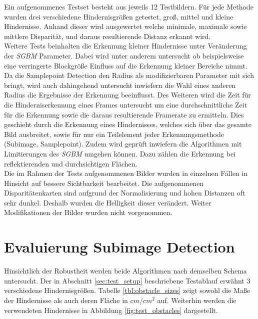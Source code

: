 \noindent
Ein aufgenommenes Testset besteht aus jeweils 12 Testbildern. Für jede Methode wurden drei verschiedene Hindernisgrößen getestet, groß, mittel und kleine Hindernisse. Anhand dieser wird ausgewertet welche minimale, maximale sowie mittlere Disparität, und daraus resultierende Distanz erkannt wird.\\

\noindent
Weitere Tests beinhalten die Erkennung kleiner Hindernisse unter Veränderung der \emph{SGBM} Parameter. Dabei wird unter anderem untersucht ob beispielsweise eine verringerte Blockgröße Einfluss auf die Erkennung kleiner Bereiche nimmt. Da die Samplepoint Detection den Radius als modifizierbaren Parameter mit sich bringt, wird auch dahingehend untersucht inwiefern die Wahl eines anderen Radius die Ergebnisse der Erkennung beeinflusst. Des Weiteren wird die Zeit für die Hinderniserkennung eines Frames untersucht um eine durchschnittliche Zeit für die Erkennung sowie die daraus resultierende Framerate zu ermitteln. Dies geschieht durch die Erkennung eines Hindernisses, welches sich über das gesamte Bild ausbreitet, sowie für nur ein Teilelement jeder Erkennungsmethode (Subimage, Samplepoint). Zudem wird geprüft inwiefern die Algorithmen mit Limitierungen des \emph{SGBM} umgehen können. Dazu zählen die Erkennung bei reflektierenden und durchsichtigen Flächen.\\

\noindent
Die im Rahmen der Tests aufgenommenen Bilder wurden in einzelnen Fällen in Hinsicht auf bessere Sichtbarkeit bearbeitet. Die aufgenommenen Disparitätenkarten sind aufgrund der Normalisierung und hohen Distanzen oft sehr dunkel. Deshalb wurden die Helligkeit dieser verändert. Weiter Modifikationen der Bilder wurden nicht vorgenommen.



\section{Evaluierung Subimage Detection}
\label{sec:evaluierung_subimage}

Hinsichtlich der Robustheit werden beide Algorithmen nach demselben Schema untersucht. Der in Abschnitt \ref{sec:test_setup} beschriebene Testablauf erwähnt 3 verschiedene Hindernisgrößen. Tabelle \ref{tbl:obstacle_sizes} zeigt sowohl die Maße der Hindernisse als auch deren Fläche in $cm/cm^2$ auf. Weiterhin werden die verwendeten Hindernisse in Abbildung \ref{fig:test_obstacles} dargestellt.

